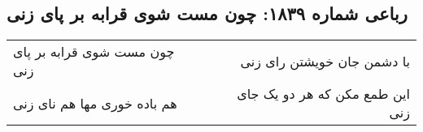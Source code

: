 \begin{center}
\section*{رباعی شماره ۱۸۳۹: چون مست شوی قرابه بر پای زنی}
\label{sec:1839}
\begin{longtable}{l p{0.5cm} r}
چون مست شوی قرابه بر پای زنی
&&
با دشمن جان خویشتن رای زنی
\\
هم باده خوری مها هم نای زنی
&&
این طمع مکن که هر دو یک جای زنی
\\
\end{longtable}
\end{center}
